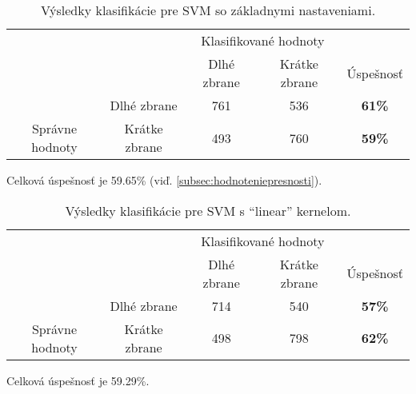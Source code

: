\begin{table}[H]
    \centering
    \begin{tabular}{ccccc}
                                                                &                                    & \multicolumn{2}{c}{Klasifikované hodnoty}                                                         &                                    \\ \cline{3-5} 
                                                                & \multicolumn{1}{c|}{}              & \multicolumn{1}{c|}{Dlhé zbrane}                & \multicolumn{1}{c|}{Krátke zbrane}              & \multicolumn{1}{c|}{Úspešnosť}     \\ \cline{2-5} 
        \multicolumn{1}{c|}{}                                  & \multicolumn{1}{c|}{Dlhé zbrane}   & \multicolumn{1}{c|}{{\color[HTML]{009901} 761}} & \multicolumn{1}{c|}{{\color[HTML]{9A0000} 536}} & \multicolumn{1}{c|}{\textbf{61\%}} \\ \cline{2-5} 
        \multicolumn{1}{c|}{\multirow{-2}{*}{Správne hodnoty}} & \multicolumn{1}{c|}{Krátke zbrane} & \multicolumn{1}{c|}{{\color[HTML]{9A0000} 493}} & \multicolumn{1}{c|}{{\color[HTML]{009901} 760}} & \multicolumn{1}{c|}{\textbf{59\%}} \\ \cline{2-5} 
    \end{tabular}
    \caption{Výsledky klasifikácie pre SVM so základnymi nastaveniami.}
    \label{tab:svmrbf}
\end{table}
Celková úspešnosť je 59.65\% (viď. \ref{subsec:hodnoteniepresnosti}).

\begin{table}[H]
    \centering
    \begin{tabular}{ccccc}
                                                                &                                    & \multicolumn{2}{c}{Klasifikované hodnoty}                                                         &                                    \\ \cline{3-5} 
                                                                & \multicolumn{1}{c|}{}              & \multicolumn{1}{c|}{Dlhé zbrane}                & \multicolumn{1}{c|}{Krátke zbrane}              & \multicolumn{1}{c|}{Úspešnosť}     \\ \cline{2-5} 
        \multicolumn{1}{c|}{}                                  & \multicolumn{1}{c|}{Dlhé zbrane}   & \multicolumn{1}{c|}{{\color[HTML]{009901} 714}} & \multicolumn{1}{c|}{{\color[HTML]{9A0000} 540}} & \multicolumn{1}{c|}{\textbf{57\%}} \\ \cline{2-5} 
        \multicolumn{1}{c|}{\multirow{-2}{*}{Správne hodnoty}} & \multicolumn{1}{c|}{Krátke zbrane} & \multicolumn{1}{c|}{{\color[HTML]{9A0000} 498}} & \multicolumn{1}{c|}{{\color[HTML]{009901} 798}} & \multicolumn{1}{c|}{\textbf{62\%}} \\ \cline{2-5} 
    \end{tabular}
    \caption{Výsledky klasifikácie pre SVM s ``linear'' kernelom.}
    \label{tab:svmlinear}
\end{table}
Celková úspešnosť je 59.29\%.

